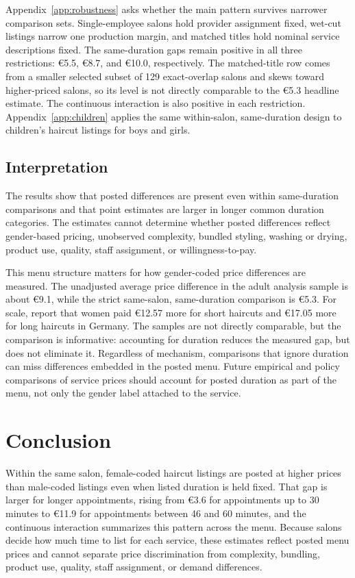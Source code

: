 \documentclass[12pt,a4paper]{article}
\begin{document}
Appendix~\ref{app:robustness} asks whether the main pattern survives narrower comparison sets. Single-employee salons hold provider assignment fixed, wet-cut listings narrow one production margin, and matched titles hold nominal service descriptions fixed. The same-duration gaps remain positive in all three restrictions: €5.5, €8.7, and €10.0, respectively. The matched-title row comes from a smaller selected subset of 129 exact-overlap salons and skews toward higher-priced salons, so its level is not directly comparable to the €5.3 headline estimate. The continuous interaction is also positive in each restriction. Appendix~\ref{app:children} applies the same within-salon, same-duration design to children's haircut listings for boys and girls.


\subsection{Interpretation}

The results show that posted differences are present even within same-duration comparisons and that point estimates are larger in longer common duration categories. The estimates cannot determine whether posted differences reflect gender-based pricing, unobserved complexity, bundled styling, washing or drying, product use, quality, staff assignment, or willingness-to-pay.

This menu structure matters for how gender-coded price differences are measured. The unadjusted average price difference in the adult analysis sample is about €9.1, while the strict same-salon, same-duration comparison is €5.3. For scale, \citet{Heiden2018-wc} report that women paid €12.57 more for short haircuts and €17.05 more for long haircuts in Germany. The samples are not directly comparable, but the comparison is informative: accounting for duration reduces the measured gap, but does not eliminate it. Regardless of mechanism, comparisons that ignore duration can miss differences embedded in the posted menu. Future empirical and policy comparisons of service prices should account for posted duration as part of the menu, not only the gender label attached to the service.

\section{Conclusion}

Within the same salon, female-coded haircut listings are posted at higher prices than male-coded listings even when listed duration is held fixed. That gap is larger for longer appointments, rising from €3.6 for appointments up to 30 minutes to €11.9 for appointments between 46 and 60 minutes, and the continuous interaction summarizes this pattern across the menu. Because salons decide how much time to list for each service, these estimates reflect posted menu prices and cannot separate price discrimination from complexity, bundling, product use, quality, staff assignment, or demand differences.
\end{document}
